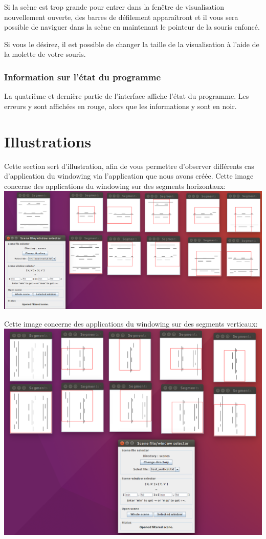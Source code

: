 \documentclass[10pt,a4paper]{article}
\begin{document}
Si la scène est trop grande pour entrer dans la fenêtre de visualisation nouvellement ouverte, des barres de défilement apparaîtront et il vous sera possible de naviguer dans la scène en maintenant le pointeur de la souris enfoncé.

Si vous le désirez, il est possible de changer la taille de la visualisation à l'aide de la molette de votre souris.

\subsubsection{Information sur l'état du programme}
La quatrième et dernière partie de l'interface affiche l'état du programme. Les erreurs y sont affichées en rouge, alors que les informations y sont en noir.

\section{Illustrations}
Cette section sert d'illustration, afin de vous permettre d'observer différents cas d'application du windowing via l'application que nous avons créée.
Cette image concerne des applications du windowing sur des segments horizontaux:
\includegraphics[scale=0.25]{images/test_horizontal.png}

Cette image concerne des applications du windowing sur des segments verticaux:
\includegraphics[scale=0.25]{images/test_vertical.png}
\end{document}
